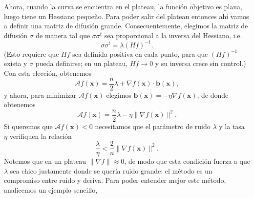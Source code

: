 \documentclass[12pt, a4paper]{amsbook}
\newcommand{\A}{{\mathcal A}}
\newcommand{\xx}{{\mathbf x}}
\newcommand{\bb}{{\mathbf b}}
\theoremstyle{remark}
\theoremstyle{definition}
\numberwithin{section}{chapter}
\numberwithin{subsection}{section}
\numberwithin{equation}{section}
\numberwithin{figure}{chapter}
\begin{document}
Ahora, cuando la curva se encuentra en el plateau, la función objetivo es plana, luego tiene un Hessiano pequeño. Para poder salir del plateau entonces ahí vamos a definir una matriz de difusión grande. Consecuentemente, elegimos la matriz de difusión $\sigma$ de manera tal que $\sigma\sigma^t$ sea proporcional a la inversa del Hessiano, i.e.
\begin{equation}\label{sigma}
\sigma\sigma^t = \lambda (Hf)^{-1}.
\end{equation}
(Esto requiere que $Hf$ sea definida positiva en cada punto, para que $(Hf)^{-1}$ exista y $\sigma$ pueda definirse; en un plateau, $Hf\to0$ y su inversa crece sin control.)
Con esta elección, obtenemos
$$
\A f(\xx) = \frac{n}{2}\lambda + \nabla f(\xx)\cdot \bb(\xx),
$$
y ahora, para minimizar $\A f(\xx)$ elegimos $\bb(\xx)=-\eta\nabla f(\xx)$, de donde obtenemos
$$
\A f(\xx) = \frac{n}{2}\lambda - \eta\|\nabla f(\xx)\|^2.
$$
Si queremos que $\A f(\xx)<0$ necesitamos que el parámetro de ruido $\lambda$ y la tasa $\eta$ verifiquen la relación
$$
\frac{\lambda}{\eta} < \frac{2}{n} \|\nabla f(\xx)\|^2.
$$
Notemos que en un plateau $\|\nabla f\|\approx0$, de modo que esta condición fuerza a que $\lambda$ sea chico justamente donde se quería ruido grande: el método es un compromiso entre ruido y deriva.
Para poder entender mejor este método, analicemos un ejemplo sencillo,
\end{document}
